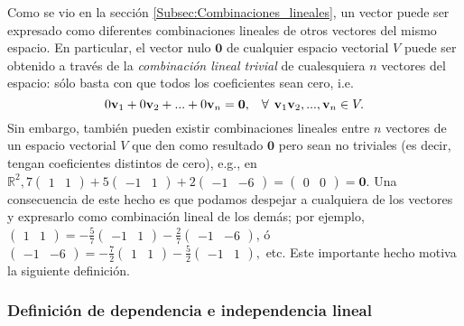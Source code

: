 \documentclass[apuntes]{subfiles}
\begin{document}
Como se vio en la sección \ref{Subsec:Combinaciones_lineales}, un vector puede ser expresado como diferentes combinaciones lineales de otros vectores del mismo espacio. En particular, el vector nulo $\mathbf{0}$ de cualquier espacio vectorial $V$ puede ser obtenido a través de la \emph{combinación lineal trivial} de cualesquiera $n$ vectores del espacio: sólo basta con que todos los coeficientes sean cero, i.e. $$0\mathbf{v}_1+0\mathbf{v}_2+...+0\mathbf{v}_n=\mathbf{0}, \hspace{3mm}\forall\hspace{1.5mm}\mathbf{v}_1 \mathbf{v}_2, ...,\mathbf{v}_n \in V.$$ Sin embargo, también pueden existir combinaciones lineales entre $n$ vectores de un espacio vectorial $V$ que den como resultado $\mathbf{0}$ pero sean no triviales (es decir, tengan coeficientes distintos de cero), e.g., en $\mathbb{R}^2, 7\begin{pmatrix} 1 & 1 \end{pmatrix}+5\begin{pmatrix} -1 & 1 \end{pmatrix}+2\begin{pmatrix} -1 & -6 \end{pmatrix}=\begin{pmatrix} 0 & 0 \end{pmatrix}=\mathbf{0}$. Una consecuencia de este hecho es que podamos despejar a cualquiera de los vectores y expresarlo como combinación lineal de los demás; por ejemplo, $\begin{pmatrix} 1 & 1 \end{pmatrix}=-\frac{5}{7}\begin{pmatrix} -1 & 1 \end{pmatrix}-\frac{2}{7}\begin{pmatrix} -1 & -6 \end{pmatrix}$, ó $\begin{pmatrix} -1 & -6 \end{pmatrix} = -\frac{7}{2}\begin{pmatrix} 1 & 1 \end{pmatrix}-\frac{5}{2}\begin{pmatrix} -1 & 1 \end{pmatrix},$ etc. Este importante hecho motiva la siguiente definición.

\subsubsection*{Definición de dependencia e independencia lineal} \label{Def:Dependencia_e_independencia_lineal}
\end{document}
